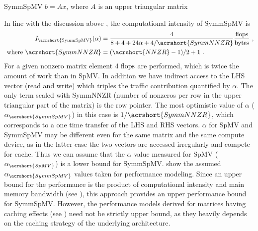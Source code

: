 \begin{algorithm}[t]
	\caption{SymmSpMV $b=Ax$, where $A$ is an upper triangular matrix} 
	\label{alg:SymmSpMV}
	\begin{algorithmic}[1]
			\ENDFOR
		\ENDFOR
	\end{algorithmic}
\end{algorithm}
In line with the discussion above , the computational intensity of \acrshort{SymmSpMV} is
\begin{align}
\label{eq:SymmSpMV_intensity}
I_\mathrm{\acrshort{SymmSpMV}} (\alpha) &= \frac{4}{8+4+24\alpha+4/\acrshort{SymmNNZR}} \frac{\FLOP}{\BYTE}\cma\\
\label{eq:NNZR_symm}
\text{ where  } \acrshort{SymmNNZR} &= (\acrshort{NNZR}-1)/2 + 1\eos
\end{align}
For a given nonzero matrix element $4~\mbox{flops}$ are performed, which is
twice the amount of work than in \acrshort{SpMV}. In addition we have
indirect access to the LHS vector (read and write) which triples the
traffic contribution quantified by $\alpha$\@. The only term scaled
with \acrshort{SymmNNZR} (number of nonzeros per row in the upper
triangular part of the matrix) is the row pointer. The most optimistic
value of $\alpha$ ($\alpha_{\acrshort{SymmSpMV}}$) in this case is
$1/{\acrshort{SymmNNZR}}$, which corresponds to a one time transfer of
the LHS and RHS vectors.  
  $\alpha$ for \acrshort{SpMV}
and \acrshort{SymmSpMV} may be different even for the same matrix and
the same compute device, as in the latter case the two vectors are
accessed irregularly and compete for cache. Thus we
can assume that the $\alpha$ value measured for \acrshort{SpMV}
($\alpha_{\acrshort{SpMV}}$) is a lower bound
for \acrshort{SymmSpMV}.  show the 
 assumed $\alpha_{\acrshort{SymmSpMV}}$ values taken for performance
modeling. Since an upper bound for the performance is the
product of computational intensity and main memory bandwidth
(see ), this approach provides an upper
performance bound for \acrshort{SymmSpMV}.  However,  the
performance models derived for matrices having caching effects
(see ) need not be strictly upper bound, as
they heavily depends on the caching strategy of the underlying
architecture.
\begin{comment}
 for a given matrix structure:
 \begin{align}
\label{eq:SymmSpMV_performance}
P^{max}_\mathrm{\acrshort{SymmSpMV}}  &= I_\mathrm{\acrshort{SymmSpMV}} (\alpha_\mathrm{\acrshort{SpMV}})  \times b_S
\end{align}
As most matrices have a considerable number of nonzeros per row, we chose $b_S$ to be the optimistic (load-only) value  from~\Cref{tab:test_bed}.
\end{comment}

